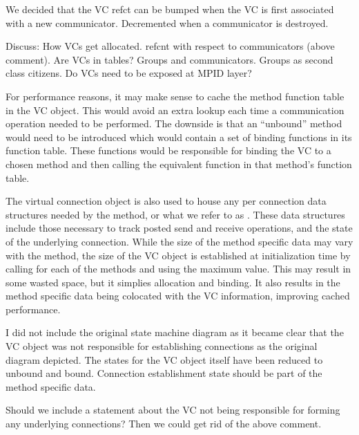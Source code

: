 \begin{cmt}[ROB]
  We decided that the VC refct can be bumped when the VC is first associated
  with a new communicator.  Decremented when a communicator is destroyed.
\end{cmt}

\todo Discuss: How VCs get allocated. refcnt with respect to communicators
(above comment).  Are VCs in tables?  Groups and communicators.  Groups as
second class citizens.  Do VCs need to be exposed at MPID layer?

\begin{implnote}
  For performance reasons, it may make sense to cache the method function table
  in the VC object.  This would avoid an extra lookup each time a communication
  operation needed to be performed.  The downside is that an ``unbound'' method
  would need to be introduced which would contain a set of binding functions in
  its function table.  These functions would be responsible for binding the VC
  to a chosen method and then calling the equivalent function in that method's
  function table.
\end{implnote}

The virtual connection object is also used to house any per connection data
structures needed by the method, or what we refer to as .  These data structures include those necessary to track posted send
and receive operations, and the state of the underlying connection.  While the
size of the method specific data may vary with the method, the size of the VC
object is established at initialization time by calling
 for each of the methods and using the maximum
value.  This may result in some wasted space, but it simplies allocation and
binding.  It also results in the method specific data being colocated with the
VC information, improving cached performance.

\begin{cmt}[BRT]
  I did not include the original state machine diagram as it became clear that
  the VC object was not responsible for establishing connections as the
  original diagram depicted.  The states for the VC object itself have been
  reduced to unbound and bound.  Connection establishment state should be part
  of the method specific data.
\end{cmt}

\Q Should we include a statement about the VC not being responsible for forming
any underlying connections?  Then we could get rid of the above comment.

